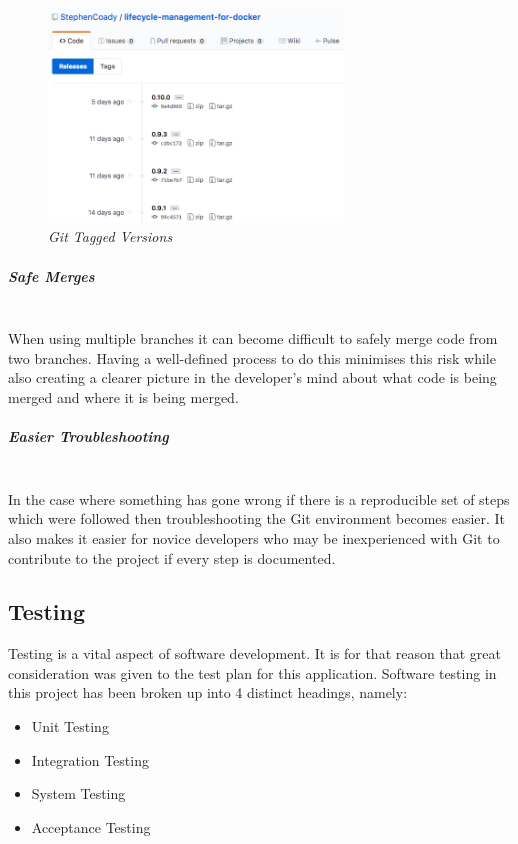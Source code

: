 \begin{figure}[!ht]
\centering
\includegraphics*[width=0.7\textwidth]{images/git_tags}
\caption{\em Git Tagged Versions}
\label{fig:git_tags}
\end{figure}

\subparagraph{Safe Merges}\mbox{}\\
When using multiple branches it can become difficult to safely merge code from two branches. Having a well-defined process to do this minimises this risk while also creating a clearer picture in the developer's mind about what code is being merged and where it is being merged.

\subparagraph{Easier Troubleshooting}\mbox{}\\
In the case where something has gone wrong if there is a reproducible set of steps which were followed then troubleshooting the Git environment becomes easier. It also makes it easier for novice developers who may be inexperienced with Git to contribute to the project if every step is documented.

\subsection{Testing}
\label{sub:testing}
Testing is a vital aspect of software development. It is for that reason that great consideration was given to the test plan for this application. Software testing in this project has been broken up into 4 distinct headings, namely:

\begin{itemize}
	\item Unit Testing
	\item Integration Testing
	\item System Testing
	\item Acceptance Testing
\end{itemize}

